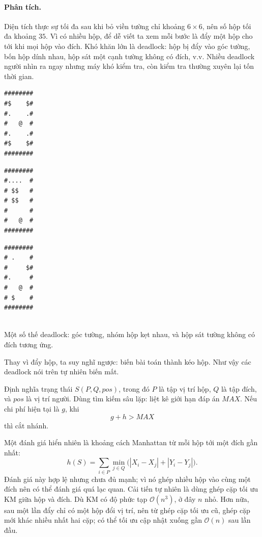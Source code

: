 \documentclass[11pt]{article}
\newcommand{\Oh}{\mathcal{O}}
\begin{document}
\paragraph{Phân tích.}
Diện tích thực sự tối đa sau khi bỏ viền tường chỉ khoảng \(6\times6\), nên số
hộp tối đa khoảng \(35\). Vì có nhiều hộp, để dễ viết ta xem mỗi bước là đẩy
một hộp cho tới khi mọi hộp vào đích. Khó khăn lớn là deadlock: hộp bị đẩy vào
góc tường, bốn hộp dính nhau, hộp sát một cạnh tường không có đích, v.v. Nhiều
deadlock người nhìn ra ngay nhưng máy khó kiểm tra, còn kiểm tra thường xuyên
lại tốn thời gian.

\begin{center}
\begin{minipage}{0.3\linewidth}
\small
\begin{verbatim}
########
#$    $#
#.    .#
#   @  #
#.    .#
#$    $#
########
\end{verbatim}
\end{minipage}
\hfill
\begin{minipage}{0.3\linewidth}
\small
\begin{verbatim}
########
#....  #
# $$   #
# $$   #
#      #
#   @  #
########
\end{verbatim}
\end{minipage}
\hfill
\begin{minipage}{0.3\linewidth}
\small
\begin{verbatim}
########
# .    #
#     $#
#.     #
#   @  #
# $    #
########
\end{verbatim}
\end{minipage}\\
\small Một số thế deadlock: góc tường, nhóm hộp kẹt nhau, và hộp sát tường
không có đích tương ứng.
\end{center}

Thay vì đẩy hộp, ta suy nghĩ ngược: biến bài toán thành kéo hộp. Như vậy các
deadlock nói trên tự nhiên biến mất.

Định nghĩa trạng thái \(S(P,Q,\mathit{pos})\), trong đó \(P\) là tập vị trí hộp,
\(Q\) là tập đích, và \(\mathit{pos}\) là vị trí người. Dùng tìm kiếm sâu lặp:
liệt kê giới hạn đáp án \(\mathit{MAX}\). Nếu chi phí hiện tại là \(g\), khi
\[
  g+h>\mathit{MAX}
\]
thì cắt nhánh.

Một đánh giá hiển nhiên là khoảng cách Manhattan từ mỗi hộp tới một đích gần
nhất:
\[
  h(S)=
  \sum_{i\in P}\min_{j\in Q}
  \bigl(|X_i-X_j|+|Y_i-Y_j|\bigr).
\]
Đánh giá này hợp lệ nhưng chưa đủ mạnh; vì nó ghép nhiều hộp vào cùng một đích
nên có thể đánh giá quá lạc quan. Cải tiến tự nhiên là dùng ghép cặp tối ưu
KM giữa hộp và đích. Dù KM có độ phức tạp \(\Oh(n^3)\), ở đây \(n\) nhỏ. Hơn
nữa, sau một lần đẩy chỉ có một hộp đổi vị trí, nên từ ghép cặp tối ưu cũ,
ghép cặp mới khác nhiều nhất hai cặp; có thể tối ưu cập nhật xuống gần
\(\Oh(n)\) sau lần đầu.
\end{document}
